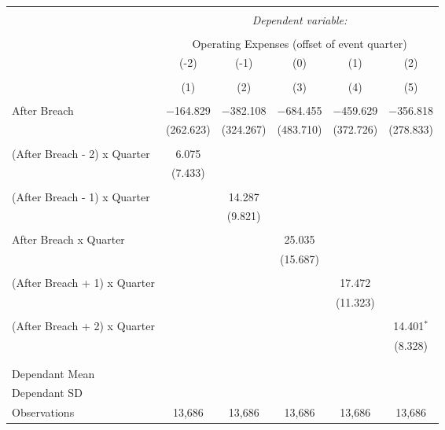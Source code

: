 
\begin{table}[!htbp] \centering 
  \caption{} 
  \label{} 
\begin{tabular}{@{\extracolsep{5pt}}lccccc} 
\\[-1.8ex]\hline 
\hline \\[-1.8ex] 
 & \multicolumn{5}{c}{\textit{Dependent variable:}} \\ 
\cline{2-6} 
\\[-1.8ex] & \multicolumn{5}{c}{Operating Expenses (offset of event quarter)} \\ 
 & (-2) & (-1) & (0) & (1) & (2) \\ 
\\[-1.8ex] & (1) & (2) & (3) & (4) & (5)\\ 
\hline \\[-1.8ex] 
 After Breach & $-$164.829 & $-$382.108 & $-$684.455 & $-$459.629 & $-$356.818 \\ 
  & (262.623) & (324.267) & (483.710) & (372.726) & (278.833) \\ 
  & & & & & \\ 
 (After Breach - 2) x Quarter & 6.075 &  &  &  &  \\ 
  & (7.433) &  &  &  &  \\ 
  & & & & & \\ 
 (After Breach - 1) x Quarter &  & 14.287 &  &  &  \\ 
  &  & (9.821) &  &  &  \\ 
  & & & & & \\ 
 After Breach x Quarter &  &  & 25.035 &  &  \\ 
  &  &  & (15.687) &  &  \\ 
  & & & & & \\ 
 (After Breach + 1) x Quarter &  &  &  & 17.472 &  \\ 
  &  &  &  & (11.323) &  \\ 
  & & & & & \\ 
 (After Breach + 2) x Quarter &  &  &  &  & 14.401$^{*}$ \\ 
  &  &  &  &  & (8.328) \\ 
  & & & & & \\ 
\hline \\[-1.8ex] 
Dependant Mean &  &  &  &  &  \\ 
Dependant SD &  &  &  &  &  \\ 
Observations & 13,686 & 13,686 & 13,686 & 13,686 & 13,686 \\ 

\end{tabular}
\end{table}
